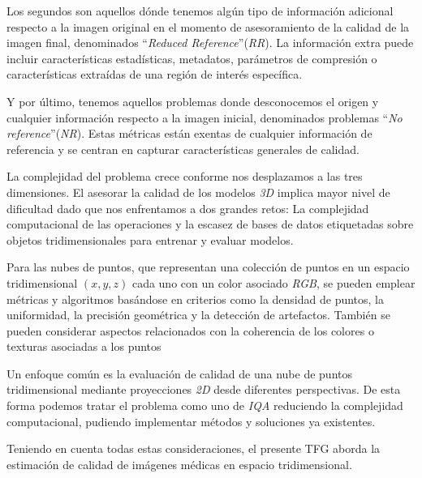 Los segundos son aquellos dónde tenemos algún tipo de información adicional respecto 
a la imagen original en el momento de asesoramiento de la calidad de la imagen final,
denominados ``\emph{Reduced Reference}''(\emph{RR}). La información extra puede incluir características estadísticas, metadatos, parámetros 
de compresión o características extraídas de una región de interés específica.
 
Y por último, tenemos aquellos problemas donde desconocemos el origen y cualquier 
información respecto a la imagen inicial, denominados problemas ``\emph{No reference}''(\emph{NR}).
Estas métricas están exentas de cualquier información de referencia y se 
centran en capturar características generales de calidad. 

La complejidad del problema crece conforme nos desplazamos a las tres dimensiones. 
El asesorar la calidad de los modelos \emph{3D} implica mayor nivel de dificultad 
dado que nos enfrentamos a dos grandes retos: La complejidad computacional 
de las operaciones y la escasez de bases de datos etiquetadas
sobre objetos tridimensionales para entrenar y evaluar modelos. 
 
Para las nubes de puntos, que representan una colección de puntos en un espacio 
tridimensional $(x,y,z)$ cada uno con un color asociado \emph{RGB}, se pueden emplear métricas y algoritmos basándose en criterios como la 
densidad de puntos, la uniformidad, la precisión geométrica y la detección de artefactos.
También se pueden considerar aspectos relacionados con la coherencia de los colores 
o texturas asociadas a los puntos\cite{NR3DQA, StructureGuidedResampling, GPA-NET} 
 
Un enfoque común es la evaluación de calidad de una nube de puntos tridimensional 
mediante proyecciones \emph{2D} desde diferentes perspectivas\cite{IT-PCQA, VQA-PC, MM-PCQA}. 
De esta forma podemos tratar el problema como uno de \emph{IQA} reduciendo la 
complejidad computacional, pudiendo implementar métodos y soluciones ya existentes.

Teniendo en cuenta todas estas consideraciones, el presente TFG aborda la
estimación de calidad de imágenes médicas en espacio tridimensional.

